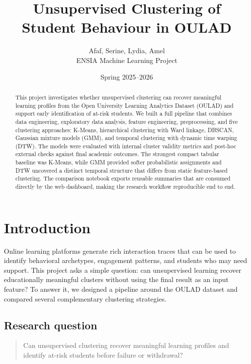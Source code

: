 \documentclass[11pt,a4paper]{article}
\title{\textbf{Unsupervised Clustering of Student Behaviour in OULAD}}
\author{Afaf, Serine, Lydia, Amel \\ ENSIA Machine Learning Project}
\date{Spring 2025--2026}
\begin{document}
\maketitle

\begin{abstract}
This project investigates whether unsupervised clustering can recover meaningful learning profiles from the Open University Learning Analytics Dataset (OULAD) and support early identification of at-risk students. We built a full pipeline that combines data engineering, exploratory data analysis, feature engineering, preprocessing, and five clustering approaches: K-Means, hierarchical clustering with Ward linkage, DBSCAN, Gaussian mixture models (GMM), and temporal clustering with dynamic time warping (DTW). The models were evaluated with internal cluster validity metrics and post-hoc external checks against final academic outcomes. The strongest compact tabular baseline was K-Means, while GMM provided softer probabilistic assignments and DTW uncovered a distinct temporal structure that differs from static feature-based clustering. The comparison notebook exports reusable summaries that are consumed directly by the web dashboard, making the research workflow reproducible end to end.
\end{abstract}

\tableofcontents
\newpage

\section{Introduction}
Online learning platforms generate rich interaction traces that can be used to identify behavioral archetypes, engagement patterns, and students who may need support. This project asks a simple question: can unsupervised learning recover educationally meaningful clusters without using the final result as an input feature? To answer it, we designed a pipeline around the OULAD dataset and compared several complementary clustering strategies.

\subsection{Research question}
\begin{quote}
Can unsupervised clustering recover meaningful learning profiles and identify at-risk students before failure or withdrawal?
\end{quote}
\end{document}

